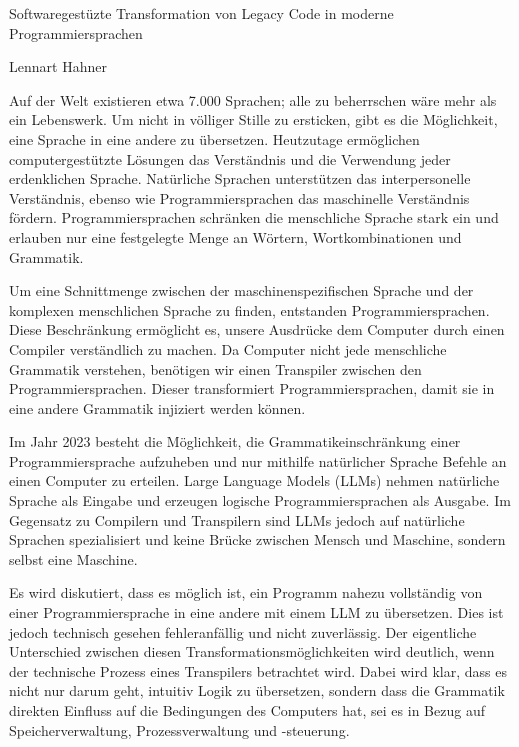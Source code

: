 \documentclass[a4paper]{article}
\begin{document}

\Large
 \begin{center}
Softwaregestüzte Transformation von Legacy Code in moderne Programmiersprachen\\ 

\hspace{10pt}

\large
Lennart Hahner \\

\hspace{10pt}


\end{center}

\hspace{10pt}

\normalsize
Auf der Welt existieren etwa 7.000 Sprachen; alle zu beherrschen wäre mehr als ein Lebenswerk. Um nicht in völliger Stille zu ersticken, gibt es die Möglichkeit, eine Sprache in eine andere zu übersetzen. Heutzutage ermöglichen computergestützte Lösungen das Verständnis und die Verwendung jeder erdenklichen Sprache. Natürliche Sprachen unterstützen das interpersonelle Verständnis, ebenso wie Programmiersprachen das maschinelle Verständnis fördern. Programmiersprachen schränken die menschliche Sprache stark ein und erlauben nur eine festgelegte Menge an Wörtern, Wortkombinationen und Grammatik.

Um eine Schnittmenge zwischen der maschinenspezifischen Sprache und der komplexen menschlichen Sprache zu finden, entstanden Programmiersprachen. Diese Beschränkung ermöglicht es, unsere Ausdrücke dem Computer durch einen Compiler verständlich zu machen. Da Computer nicht jede menschliche Grammatik verstehen, benötigen wir einen Transpiler zwischen den Programmiersprachen. Dieser transformiert Programmiersprachen, damit sie in eine andere Grammatik injiziert werden können.

Im Jahr 2023 besteht die Möglichkeit, die Grammatikeinschränkung einer Programmiersprache aufzuheben und nur mithilfe natürlicher Sprache Befehle an einen Computer zu erteilen. Large Language Models (LLMs) nehmen natürliche Sprache als Eingabe und erzeugen logische Programmiersprachen als Ausgabe. Im Gegensatz zu Compilern und Transpilern sind LLMs jedoch auf natürliche Sprachen spezialisiert und keine Brücke zwischen Mensch und Maschine, sondern selbst eine Maschine.

Es wird diskutiert, dass es möglich ist, ein Programm nahezu vollständig von einer Programmiersprache in eine andere mit einem LLM zu übersetzen. Dies ist jedoch technisch gesehen fehleranfällig und nicht zuverlässig. Der eigentliche Unterschied zwischen diesen Transformationsmöglichkeiten wird deutlich, wenn der technische Prozess eines Transpilers betrachtet wird. Dabei wird klar, dass es nicht nur darum geht, intuitiv Logik zu übersetzen, sondern dass die Grammatik direkten Einfluss auf die Bedingungen des Computers hat, sei es in Bezug auf Speicherverwaltung, Prozessverwaltung und -steuerung.
\end{document}
